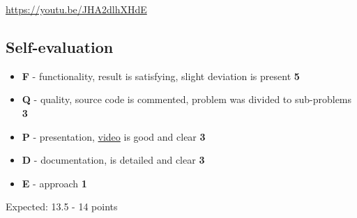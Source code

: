 \documentclass[a4paper, 11pt, twocolumn]{article}
\begin{document}
\url{https://youtu.be/JHA2dlhXHdE}

\onecolumn
\subsection{Self-evaluation}
\begin{itemize}
  \item \textbf{F} - functionality, result is satisfying, slight deviation is present \textbf{5}
  \item \textbf{Q} - quality, source code is commented, problem was divided to sub-problems \textbf{3}
  \item \textbf{P} - presentation, \href{https://youtu.be/JHA2dlhXHdE}{video} is good and clear \textbf{3}
  \item \textbf{D} - documentation, is detailed and clear \textbf{3}
  \item \textbf{E} - approach \textbf{1}
\end{itemize}
Expected: 13.5 - 14 points

    
    \printbibliography[heading=bibintoc]
\end{document}
